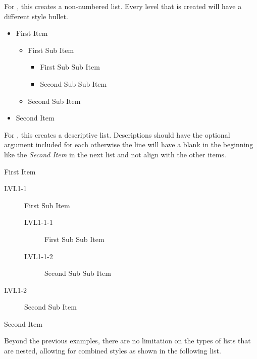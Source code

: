         For , this creates a non-numbered list.
        Every level that is created will have a different style bullet.
        \begin{itemize}
            \item First Item
                \begin{itemize}
                    \item First Sub Item
                        \begin{itemize}
                            \item First Sub Sub Item
                            \item Second Sub Sub Item
                        \end{itemize}
                    \item Second Sub Item
                \end{itemize}
            \item Second Item
        \end{itemize}
        For , this creates a descriptive list.
        Descriptions should have the optional argument included for each  otherwise the line will have a blank in the beginning like the \textit{Second Item} in the next list and not align with the other items.
        \begin{description}
            \item[LVL1] First Item
                \begin{description}
                    \item[LVL1-1] First Sub Item
                        \begin{description}
                            \item[LVL1-1-1] First Sub Sub Item
                            \item[LVL1-1-2] Second Sub Sub Item
                        \end{description}
                    \item[LVL1-2] Second Sub Item
                \end{description}
            \item Second Item
        \end{description}
        Beyond the previous examples, there are no limitation on the types of lists that are nested, allowing for combined styles as shown in the following list.
